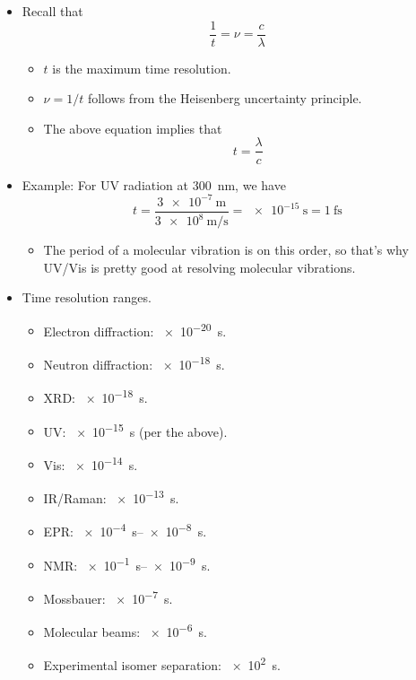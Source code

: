 \documentclass[../notes.tex]{subfiles}
\begin{document}
\begin{itemize}
\begin{itemize}
    \end{itemize}
    \item Recall that
    \begin{equation*}
        \frac{1}{t} = \nu = \frac{c}{\lambda}
    \end{equation*}
    \begin{itemize}
        \item $t$ is the maximum time resolution.
        \item $\nu=1/t$ follows from the Heisenberg uncertainty principle.
        \item The above equation implies that
        \begin{equation*}
            t = \frac{\lambda}{c}
        \end{equation*}
    \end{itemize}
    \item Example: For UV radiation at \SI{300}{\nano\meter}, we have
    \begin{equation*}
        t = \frac{\SI{3e-7}{\meter}}{\SI{3e8}{\meter\per\second}} = \SI{e-15}{\second} = \SI{1}{\femto\second}
    \end{equation*}
    \begin{itemize}
        \item The period of a molecular vibration is on this order, so that's why UV/Vis is pretty good at resolving molecular vibrations.
    \end{itemize}
    \item Time resolution ranges.
    \begin{itemize}
        \item Electron diffraction: \SI{e-20}{\second}.
        \item Neutron diffraction: \SI{e-18}{\second}.
        \item XRD: \SI{e-18}{\second}.
        \item UV: \SI{e-15}{\second} (per the above).
        \item Vis: \SI{e-14}{\second}.
        \item IR/Raman: \SI{e-13}{\second}.
        \item EPR: \SIrange{e-4}{e-8}{\second}.
        \item NMR: \SIrange{e-1}{e-9}{\second}.
        \item Mossbauer: \SI{e-7}{\second}.
        \item Molecular beams: \SI{e-6}{\second}.
        \item Experimental isomer separation: \SI{e2}{\second}.

\end{itemize}
\end{itemize}
\end{document}
